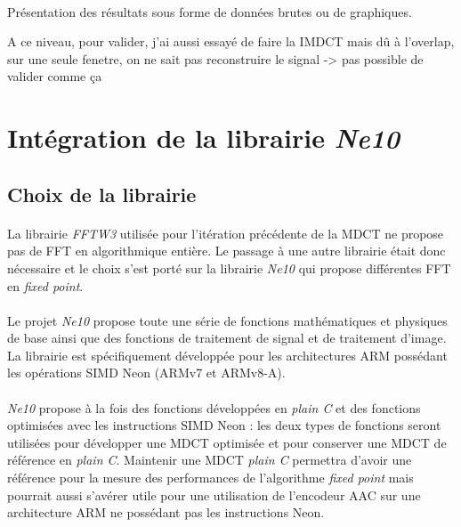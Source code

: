 \documentclass{article}
\begin{document}
    \paragraph{}
    Présentation des résultats sous forme de données brutes ou de graphiques.

    A ce niveau, pour valider, j'ai aussi essayé de faire la IMDCT mais dû à l'overlap, sur une seule fenetre, on ne sait pas reconstruire le signal -> pas possible de valider comme ça


    \newpage
    \section{Intégration de la librairie \emph{Ne10}}
    \subsection{Choix de la librairie}
    \paragraph{}
    La librairie \emph{FFTW3} utilisée pour l'itération précédente de la MDCT ne propose pas de FFT en algorithmique entière. Le passage à une autre librairie était donc nécessaire et le choix s'est porté sur la librairie \emph{Ne10} qui propose différentes FFT en \emph{fixed point}.

    \paragraph{}
    Le projet \emph{Ne10} propose toute une série de fonctions mathématiques et physiques de base ainsi que des fonctions de traitement de signal et de traitement d'image. La librairie est spécifiquement développée pour les architectures ARM possédant les opérations SIMD Neon (ARMv7 et ARMv8-A)\cite{Ne10}.

    \paragraph{}
    \emph{Ne10} propose à la fois des fonctions développées en \emph{plain C} et des fonctions optimisées avec les instructions SIMD Neon : les deux types de fonctions seront utilisées pour développer une MDCT optimisée et pour conserver une MDCT de référence en \emph{plain C}. Maintenir une MDCT \emph{plain C} permettra d'avoir une référence pour la mesure des performances de l'algorithme \emph{fixed point} mais pourrait aussi s'avérer utile pour une utilisation de l'encodeur AAC sur une architecture ARM ne possédant pas les instructions Neon.
\end{document}

